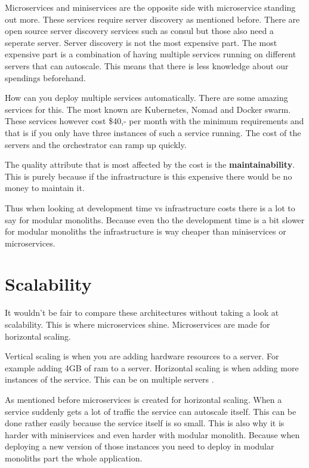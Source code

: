 Microservices and miniservices are the opposite side with microservice standing out more. These services require server discovery as mentioned before. There are open source server discovery services such as consul but those also need a seperate server. Server discovery is not the most expensive part. The most expensive part is a combination of having multiple services running on different servers that can autoscale. This means that there is less knowledge about our spendings beforehand.

How can you deploy multiple services automatically. There are some amazing services for this. The most known are Kubernetes, Nomad and Docker swarm. These services however cost \$40,- per month with the minimum requirements and that is if you only have three instances of such a service running. The cost of the servers and the orchestrator can ramp up quickly.

The quality attribute that is most affected by the cost is the \textbf{maintainability}. This is purely because if the infrastructure is this expensive there would be no money to maintain it.

Thus when looking at development time vs infrastructure costs there is a lot to say for modular monoliths. Because even tho the development time is a bit slower for modular monoliths the infrastructure is way cheaper than miniservices or microservices.

\section{Scalability}
\label{sec:Scalability}

It wouldn’t be fair to compare these architectures without taking a look at scalability. This is where microservices shine. Microservices are made for horizontal scaling.

Vertical scaling is when you are adding hardware resources to a server. For example adding 4GB of ram to a server. Horizontal scaling is when adding more instances of the service. This can be on multiple servers \cite{microservicesMultipleServer}.

As mentioned before microservices is created for horizontal scaling. When a service suddenly gets a lot of traffic the service can autoscale itself. This can be done rather easily because the service itself is so small. This is also why it is harder with miniservices and even harder with modular monolith. Because when deploying a new version of those instances you need to deploy in modular monoliths part the whole application.

